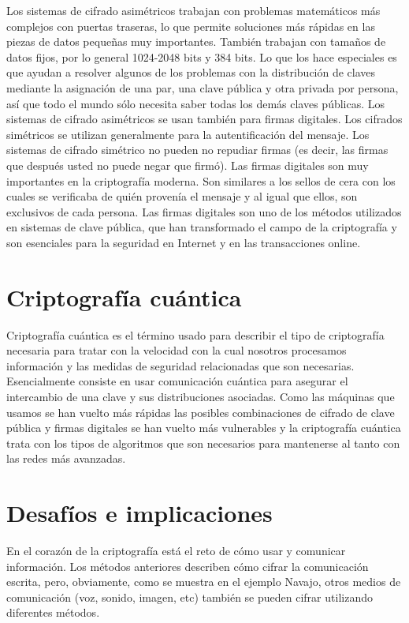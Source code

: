 \documentclass[10pt,a5paper,twoside,,]{book}
\begin{document}
Los sistemas de cifrado asimétricos trabajan con problemas matemáticos
más complejos con puertas traseras, lo que permite soluciones más
rápidas en las piezas de datos pequeñas muy importantes. También
trabajan con tamaños de datos fijos, por lo general 1024-2048 bits y 384
bits. Lo que los hace especiales es que ayudan a resolver algunos de los
problemas con la distribución de claves mediante la asignación de una
par, una clave pública y otra privada por persona, así que todo el mundo
sólo necesita saber todas los demás claves públicas. Los sistemas de
cifrado asimétricos se usan también para firmas digitales. Los cifrados
simétricos se utilizan generalmente para la autentificación del mensaje.
Los sistemas de cifrado simétrico no pueden no repudiar firmas (es
decir, las firmas que después usted no puede negar que firmó). Las
firmas digitales son muy importantes en la criptografía moderna. Son
similares a los sellos de cera con los cuales se verificaba de quién
provenía el mensaje y al igual que ellos, son exclusivos de cada
persona. Las firmas digitales son uno de los métodos utilizados en
sistemas de clave pública, que han transformado el campo de la
criptografía y son esenciales para la seguridad en Internet y en las
transacciones online.

\section{Criptografía cuántica}\label{criptografuxeda-cuuxe1ntica}

Criptografía cuántica es el término usado para describir el tipo de
criptografía necesaria para tratar con la velocidad con la cual nosotros
procesamos información y las medidas de seguridad relacionadas que son
necesarias. Esencialmente consiste en usar comunicación cuántica para
asegurar el intercambio de una clave y sus distribuciones asociadas.
Como las máquinas que usamos se han vuelto más rápidas las posibles
combinaciones de cifrado de clave pública y firmas digitales se han
vuelto más vulnerables y la criptografía cuántica trata con los tipos de
algoritmos que son necesarios para mantenerse al tanto con las redes más
avanzadas.

\section{Desafíos e implicaciones}\label{desafuxedos-e-implicaciones}

En el corazón de la criptografía está el reto de cómo usar y comunicar
información. Los métodos anteriores describen cómo cifrar la
comunicación escrita, pero, obviamente, como se muestra en el ejemplo
Navajo, otros medios de comunicación (voz, sonido, imagen, etc) también
se pueden cifrar utilizando diferentes métodos.
\end{document}
